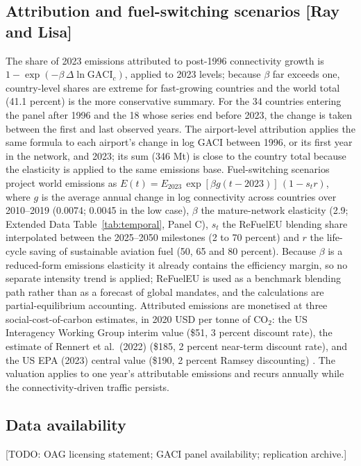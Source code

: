 \documentclass[12pt]{extarticle}
\begin{document}
\subsection*{Attribution and fuel-switching scenarios [Ray and Lisa]}
The share of 2023 emissions attributed to post-1996 connectivity growth is
$1 - \exp(-\beta\,\Delta \ln \mathrm{GACI}_c)$, applied to 2023 levels;
because $\beta$ far exceeds one, country-level shares are extreme for
fast-growing countries and the world total (41.1 percent) is the more
conservative summary. For the 34 countries entering the panel after 1996 and the 18 whose series end before 2023, the change is taken between the first and last observed years. The airport-level attribution applies the same
formula to each airport's change in log GACI between 1996, or its first
year in the network, and 2023; its sum (346 Mt) is close to the country
total because the elasticity is applied to the same emissions base. Fuel-switching scenarios project world emissions as
$E(t) = E_{2023}\,\exp[\beta g (t-2023)]\,(1 - s_t r)$, where $g$ is the
average annual change in log connectivity across countries over
2010--2019 (0.0074; 0.0045 in the low case), $\beta$ the mature-network
elasticity (2.9; Extended Data Table~\ref{tab:temporal}, Panel C), $s_t$
the ReFuelEU blending share interpolated between the 2025--2050 milestones
(2 to 70 percent) and $r$ the life-cycle saving of sustainable aviation
fuel (50, 65 and 80 percent). Because $\beta$ is a reduced-form emissions
elasticity it already contains the efficiency margin, so no separate
intensity trend is applied; ReFuelEU is used as a benchmark blending path
rather than as a forecast of global mandates, and the calculations are
partial-equilibrium accounting. Attributed emissions are monetised at three
social-cost-of-carbon estimates, in 2020 USD per tonne of CO$_2$: the US
Interagency Working Group interim value (\$51, 3 percent discount rate),
the estimate of Rennert et al.\ (2022) (\$185, 2 percent near-term
discount rate), and the US EPA (2023) central value (\$190, 2 percent
Ramsey discounting) \citep{iwg2021,rennert2022,epa2023}. The valuation applies to one year's
attributable emissions and recurs annually while the connectivity-driven
traffic persists.

\subsection*{Data availability}
[TODO: OAG licensing statement; GACI panel availability; replication
archive.]
\end{document}
